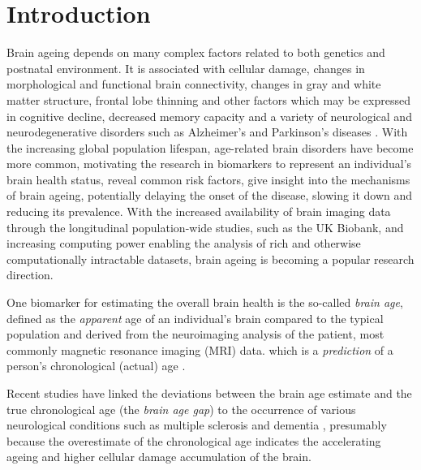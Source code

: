 \chapter{Introduction}


Brain ageing depends on many complex factors related to both genetics and postnatal environment. It is associated with cellular damage, changes in morphological and functional brain connectivity, changes in gray and white matter structure, frontal lobe thinning and other factors which may be expressed in cognitive decline, decreased memory capacity and a variety of neurological and neurodegenerative disorders such as Alzheimer's and Parkinson's diseases \cite{cole2018brain, niu2019improved, franke2019ten}. With the increasing global population lifespan, age-related brain disorders have become more common, motivating the research in biomarkers to represent an individual's brain health status, reveal common risk factors, give insight into the mechanisms of brain ageing, potentially delaying the onset of the disease, slowing it down and reducing its prevalence. With the increased availability of brain imaging data through the longitudinal population-wide studies, such as the UK Biobank, and increasing computing power enabling the analysis of rich and otherwise computationally intractable datasets, brain ageing is becoming a popular research direction.

One biomarker for estimating the overall brain health is the so-called \textit{brain age}, defined as the \textit{apparent} age of an individual's brain compared to the typical population and derived from the neuroimaging analysis of the patient, most commonly magnetic resonance imaging (MRI) data. which is a \textit{prediction} of a person's chronological (actual) age .

Recent studies have linked the deviations between the brain age estimate and the true chronological age (the \textit{brain age gap}) to the occurrence of various neurological conditions such as multiple sclerosis and dementia \cite{kaufmann2019}, presumably because the overestimate of the chronological age indicates the accelerating ageing and higher cellular damage accumulation of the brain.

